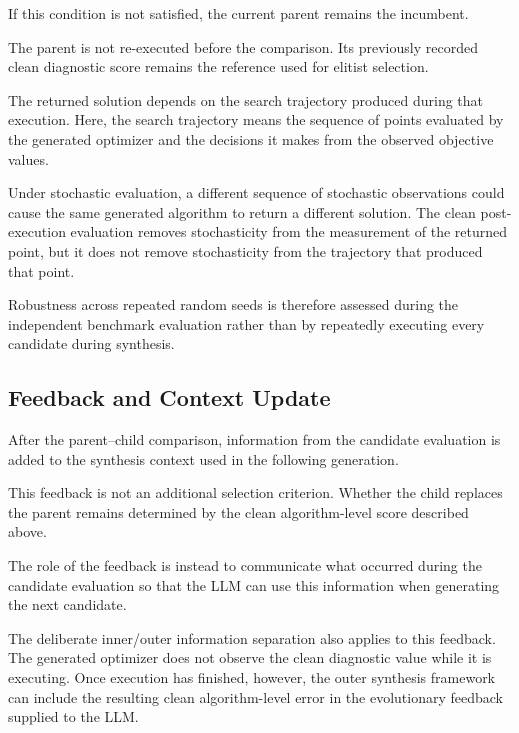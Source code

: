 If this condition is not satisfied, the current parent remains the incumbent.

The parent is not re-executed before the comparison. Its previously recorded
clean diagnostic score remains the reference used for elitist selection.

The returned solution depends on the search trajectory produced during
that execution. Here, the search trajectory means the sequence of
points evaluated by the generated optimizer and the decisions it makes from
the observed objective values.

Under stochastic evaluation, a different sequence of stochastic observations
could cause the same generated algorithm to return a different solution. The
clean post-execution evaluation removes stochasticity from the measurement of
the returned point, but it does not remove stochasticity from the trajectory
that produced that point.

Robustness across repeated random seeds is therefore assessed during the
independent benchmark evaluation rather than by repeatedly executing every
candidate during synthesis.

\subsection{Feedback and Context Update}
\label{subsec:feedback_update}

After the parent--child comparison, information from the candidate evaluation
is added to the synthesis context used in the following generation.

This feedback is not an additional selection criterion. Whether the child
replaces the parent remains determined by the clean algorithm-level score
described above.

The role of the feedback is instead to communicate what occurred during the
candidate evaluation so that the LLM can use this information when generating
the next candidate.

The deliberate inner/outer information separation also applies to this
feedback. The generated optimizer does not observe the clean diagnostic value
while it is executing. Once execution has finished, however, the outer
synthesis framework can include the resulting clean algorithm-level error in
the evolutionary feedback supplied to the LLM.

